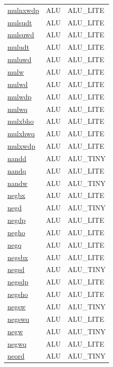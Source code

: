 \begin{small}
\begin{longtable}[l]{l l l}
\hyperlink{lvx.mulnxwdp}{mulnxwdp} & ALU & ALU\_LITE \\ 
\hyperlink{lvx.mulsudt}{mulsudt} & ALU & ALU\_LITE \\ 
\hyperlink{lvx.mulsuwd}{mulsuwd} & ALU & ALU\_LITE \\ 
\hyperlink{lvx.muludt}{muludt} & ALU & ALU\_LITE \\ 
\hyperlink{lvx.muluwd}{muluwd} & ALU & ALU\_LITE \\ 
\hyperlink{lvx.mulw}{mulw} & ALU & ALU\_LITE \\ 
\hyperlink{lvx.mulwd}{mulwd} & ALU & ALU\_LITE \\ 
\hyperlink{lvx.mulwdp}{mulwdp} & ALU & ALU\_LITE \\ 
\hyperlink{lvx.mulwq}{mulwq} & ALU & ALU\_LITE \\ 
\hyperlink{lvx.mulxbho}{mulxbho} & ALU & ALU\_LITE \\ 
\hyperlink{lvx.mulxhwq}{mulxhwq} & ALU & ALU\_LITE \\ 
\hyperlink{lvx.mulxwdp}{mulxwdp} & ALU & ALU\_LITE \\ 
\hyperlink{lvx.nandd}{nandd} & ALU & ALU\_TINY \\ 
\hyperlink{lvx.nandq}{nandq} & ALU & ALU\_LITE \\ 
\hyperlink{lvx.nandw}{nandw} & ALU & ALU\_TINY \\ 
\hyperlink{lvx.negbx}{negbx} & ALU & ALU\_LITE \\ 
\hyperlink{lvx.negd}{negd} & ALU & ALU\_TINY \\ 
\hyperlink{lvx.negdp}{negdp} & ALU & ALU\_LITE \\ 
\hyperlink{lvx.negho}{negho} & ALU & ALU\_LITE \\ 
\hyperlink{lvx.negq}{negq} & ALU & ALU\_LITE \\ 
\hyperlink{lvx.negsbx}{negsbx} & ALU & ALU\_LITE \\ 
\hyperlink{lvx.negsd}{negsd} & ALU & ALU\_TINY \\ 
\hyperlink{lvx.negsdp}{negsdp} & ALU & ALU\_LITE \\ 
\hyperlink{lvx.negsho}{negsho} & ALU & ALU\_LITE \\ 
\hyperlink{lvx.negsw}{negsw} & ALU & ALU\_TINY \\ 
\hyperlink{lvx.negswq}{negswq} & ALU & ALU\_LITE \\ 
\hyperlink{lvx.negw}{negw} & ALU & ALU\_TINY \\ 
\hyperlink{lvx.negwq}{negwq} & ALU & ALU\_LITE \\ 
\hyperlink{lvx.neord}{neord} & ALU & ALU\_TINY \\ 

\end{longtable}
\end{small}
